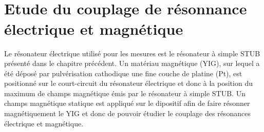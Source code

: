 \documentclass[12pt,fleqn]{book} %
\begin{document}
~\\\\
\chapter{Etude du couplage de résonnance électrique et magnétique }
Le résonateur électrique utilisé pour les mesures est le résonateur à simple STUB présenté dans le chapitre précédent. Un matériau magnétique (YIG), sur lequel a été déposé par pulvérisation cathodique une fine couche de platine (Pt), est positionné sur le court-circuit du résonateur électrique et donc à la position du maximum de champs magnétique émis par le résonateur à simple STUB. Un champs magnétique statique est appliqué sur le dipositif afin de faire résonner magnétiquement le YIG et donc de pouvoir étudier le couplage des résonances électrique et magnétique.
\end{document}
